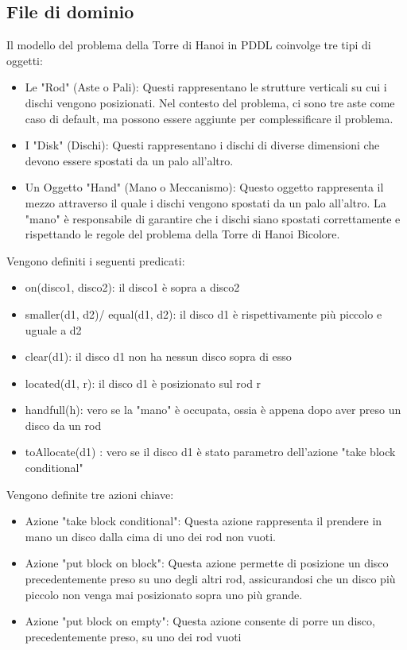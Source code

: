 \documentclass{article}
\begin{document}
\subsection{File di dominio}

Il modello del problema della Torre di Hanoi in PDDL coinvolge tre tipi di oggetti:

\begin{itemize}
  \item Le "Rod" (Aste o Pali): Questi rappresentano le strutture verticali su cui i dischi vengono posizionati. Nel contesto del problema, ci sono tre aste come caso di default, ma possono essere aggiunte per complessificare il problema.
  \item I "Disk" (Dischi): Questi rappresentano i dischi di diverse dimensioni che devono essere spostati da un palo all'altro.
  \item Un Oggetto "Hand" (Mano o Meccanismo): Questo oggetto rappresenta il mezzo attraverso il quale i dischi vengono spostati da un palo all'altro. La "mano" è responsabile di garantire che i dischi siano spostati correttamente e rispettando le regole del problema della Torre di Hanoi Bicolore.
\end{itemize}

Vengono definiti i seguenti predicati:
\begin{itemize}
  \item on(disco1, disco2): il disco1 è sopra a disco2
  \item smaller(d1, d2)/ equal(d1, d2): il disco d1 è rispettivamente più piccolo e uguale a d2
  \item clear(d1): il disco d1 non ha nessun disco sopra di esso
  \item located(d1, r): il disco d1 è posizionato sul rod r
  \item handfull(h): vero se la "mano" è occupata, ossia è appena dopo aver preso un disco da un rod
  \item toAllocate(d1) : vero se il disco d1 è stato parametro dell'azione "take block conditional"  
\end{itemize}


Vengono definite tre azioni chiave:
\begin{itemize}
  \item Azione "take block conditional": Questa azione rappresenta il prendere in mano un disco dalla cima di uno dei rod non vuoti. 
  \item Azione "put block on block": Questa azione permette di posizione un disco precedentemente preso su uno degli altri rod, assicurandosi che un disco più piccolo non venga mai posizionato sopra uno più grande.
  \item Azione "put block on empty": Questa azione consente di porre un disco, precedentemente preso, su uno dei rod vuoti
\end{itemize}
\end{document}
